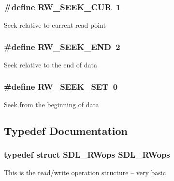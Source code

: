 \subsubsection[{R\+W\+\_\+\+S\+E\+E\+K\+\_\+\+C\+U\+R}]{\setlength{\rightskip}{0pt plus 5cm}\#define R\+W\+\_\+\+S\+E\+E\+K\+\_\+\+C\+U\+R~1}\label{_s_d_l__rwops_8h_aba5f3b60c197def370ffa2ca1ab1348d}
Seek relative to current read point 
\subsubsection[{R\+W\+\_\+\+S\+E\+E\+K\+\_\+\+E\+N\+D}]{\setlength{\rightskip}{0pt plus 5cm}\#define R\+W\+\_\+\+S\+E\+E\+K\+\_\+\+E\+N\+D~2}\label{_s_d_l__rwops_8h_a6cf141faabd1b8f2ec3c03cf76eaf553}
Seek relative to the end of data 
\subsubsection[{R\+W\+\_\+\+S\+E\+E\+K\+\_\+\+S\+E\+T}]{\setlength{\rightskip}{0pt plus 5cm}\#define R\+W\+\_\+\+S\+E\+E\+K\+\_\+\+S\+E\+T~0}\label{_s_d_l__rwops_8h_ac028b032bb8230df64bc6284e04789f5}
Seek from the beginning of data 

\subsection{Typedef Documentation}
\subsubsection[{S\+D\+L\+\_\+\+R\+Wops}]{\setlength{\rightskip}{0pt plus 5cm}typedef struct {\bf S\+D\+L\+\_\+\+R\+Wops}  {\bf S\+D\+L\+\_\+\+R\+Wops}}\label{_s_d_l__rwops_8h_af758c42c576a0612bdf298c5823a5fe5}
This is the read/write operation structure -- very basic 